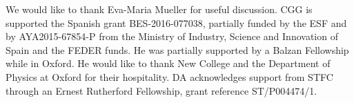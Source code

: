 \documentclass[a4paper,11pt]{article}
\begin{document}
\acknowledgments

We would like to thank Eva-Maria Mueller for useful discussion. CGG is
supported the Spanish grant BES-2016-077038, partially funded by the ESF and by
AYA2015-67854-P from the Ministry of Industry, Science and Innovation of Spain
and the FEDER funds. He was partially supported by a Balzan Fellowship while
in Oxford. He would like to thank New College and the Department of Physics at
Oxford for their hospitality. DA acknowledges support from STFC through an
Ernest Rutherford Fellowship, grant reference ST/P004474/1.

\appendix



\end{document}
